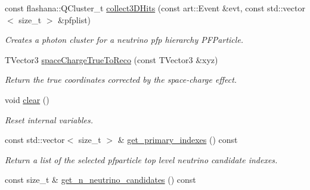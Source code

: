 \begin{DoxyCompactItemize}
const flashana\-::\-Q\-Cluster\-\_\-t \hyperlink{classlee_1_1ElectronEventSelectionAlg_a06a3e470d9b2ca729d25822fac19e455}{collect3\-D\-Hits} (const art\-::\-Event \&evt, const std\-::vector$<$ size\-\_\-t $>$ \&pfplist)
\begin{DoxyCompactList}\small\item\em Creates a photon cluster for a neutrino pfp hierarchy P\-F\-Particle. \end{DoxyCompactList}\item 
T\-Vector3 \hyperlink{classlee_1_1ElectronEventSelectionAlg_afb99143e1546158d3f030724694e6a51}{space\-Charge\-True\-To\-Reco} (const T\-Vector3 \&xyz)
\begin{DoxyCompactList}\small\item\em Return the true coordinates corrected by the space-\/charge effect. \end{DoxyCompactList}\item 
\hypertarget{classlee_1_1ElectronEventSelectionAlg_ad936812d5e9dc7999a37c75b84b04ada}{void \hyperlink{classlee_1_1ElectronEventSelectionAlg_ad936812d5e9dc7999a37c75b84b04ada}{clear} ()}\label{classlee_1_1ElectronEventSelectionAlg_ad936812d5e9dc7999a37c75b84b04ada}

\begin{DoxyCompactList}\small\item\em Reset internal variables. \end{DoxyCompactList}\item 
\hypertarget{classlee_1_1ElectronEventSelectionAlg_a317c107f710fc965cd7e062ac933d3df}{const std\-::vector$<$ size\-\_\-t $>$ \& \hyperlink{classlee_1_1ElectronEventSelectionAlg_a317c107f710fc965cd7e062ac933d3df}{get\-\_\-primary\-\_\-indexes} () const }\label{classlee_1_1ElectronEventSelectionAlg_a317c107f710fc965cd7e062ac933d3df}

\begin{DoxyCompactList}\small\item\em Return a list of the selected pfparticle top level neutrino candidate indexes. \end{DoxyCompactList}\item 
\hypertarget{classlee_1_1ElectronEventSelectionAlg_a6259851e755db48eb0dd831708212e27}{const size\-\_\-t \& \hyperlink{classlee_1_1ElectronEventSelectionAlg_a6259851e755db48eb0dd831708212e27}{get\-\_\-n\-\_\-neutrino\-\_\-candidates} () const }\label{classlee_1_1ElectronEventSelectionAlg_a6259851e755db48eb0dd831708212e27}


\end{DoxyCompactItemize}
